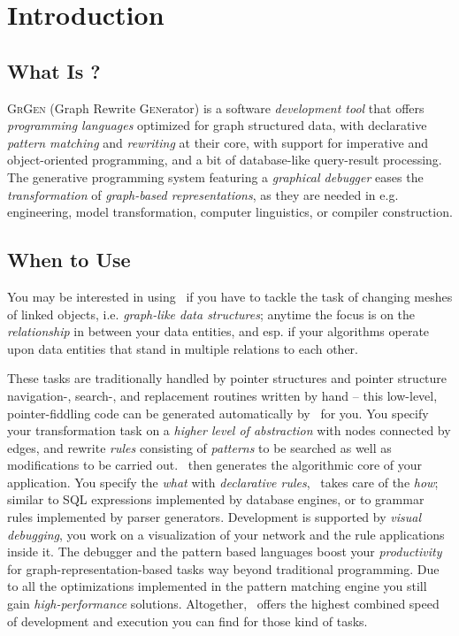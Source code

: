 \chapter{Introduction}
\label{chp:intro}


\section{What Is \GrG?}

{\scshape GrGen} (\textsc{G}raph \textsc{R}ewrite \textsc{Gen}erator) is a software \emph{development tool} that offers \emph{programming languages} optimized for graph structured data, with declarative \emph{pattern matching} and \emph{rewriting} at their core, with support for imperative and object-oriented programming, and a bit of database-like query-result processing.
The generative programming system featuring a \emph{graphical debugger} eases the \emph{transformation} of \emph{graph-based representations}, as they are needed in e.g. engineering, model transformation, computer linguistics, or compiler construction.

\section{When to Use \GrG}
You may be interested in using \GrG\ if you have to tackle the task of changing meshes of linked objects, i.e. \emph{graph-like data structures};
anytime the focus is on the \emph{relationship} in between your data entities,
and esp. if your algorithms operate upon data entities that stand in multiple relations to each other.

These tasks are traditionally handled by pointer structures and pointer structure navi\-gation-, search-, and replacement routines written by hand
-- this low-level, pointer-fiddling code can be generated automatically by \GrG\ for you.
You specify your transformation task on a \emph{higher level of abstraction} with nodes connected by edges,
and rewrite \emph{rules} consisting of \emph{patterns} to be searched as well as modifications to be carried out.
\GrG\ then generates the algorithmic core of your application.
You specify the \emph{what} with \emph{declarative rules}, \GrG\ takes care of the \emph{how};
similar to SQL expressions implemented by database engines, 
or to grammar rules implemented by parser generators.
Development is supported by \emph{visual debugging}, you work on a visualization of your network and the rule applications inside it.
The debugger and the pattern based languages boost your \emph{productivity} for graph-representation-based tasks way beyond traditional programming.
Due to all the optimizations implemented in the pattern matching engine you still gain \emph{high-performance} solutions.
Altogether, \GrG\ offers the highest combined speed of development and execution you can find for those kind of tasks.

